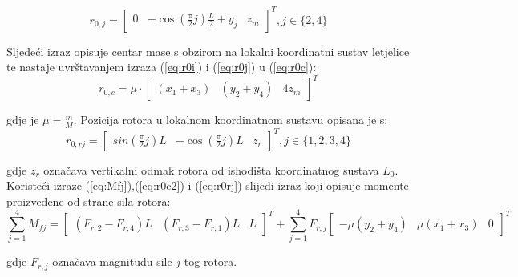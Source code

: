 \documentclass[11pt,a4paper]{article}
\begin{document}
\begin{equation}
r_{0,j} = \left[
\begin{matrix}
0 & -\cos\left(\frac{\pi}{2}j\right)\frac{L}{2} + y_{j} & z_{m}
\end{matrix} \right] ^{T}, j \in \{ 2, 4\}
\label{eq:r0j}
\end{equation}

 
Sljedeći izraz opisuje centar mase s obzirom na lokalni koordinatni sustav letjelice te nastaje uvrštavanjem izraza (\ref{eq:r0i}) i (\ref{eq:r0j}) u (\ref{eq:r0c}):
\begin{equation}
r_{0,c} = \mu \cdot \left[
\begin{matrix}
(x_{1} + x_{3}) & (y_{2} + y_{4}) & 4z_{m}
\end{matrix} \right]^{T}
\label{eq:r0c2}
\end{equation}

gdje je $\mu = \frac{m}{M}$. Pozicija rotora u lokalnom koordinatnom sustavu opisana je s:
\begin{equation}
r_{0,rj} = \left[
\begin{matrix}
sin\left(\frac{\pi}{2}j\right)L & -\cos\left(\frac{\pi}{2}j\right)L & z_{r}
\end{matrix} \right] ^{T}, j \in \{ 1, 2, 3, 4\}
\label{eq:r0rj}
\end{equation}

gdje $z_{r}$ označava vertikalni odmak rotora od ishodišta koordinatnog sustava $L_{0}$. Koristeći izraze (\ref{eq:Mfj}),(\ref{eq:r0c2}) i (\ref{eq:r0rj}) slijedi izraz koji opisuje momente proizvedene od strane sila rotora:
\begin{equation}
\sum_{j=1}^{4}M_{fj} = \left[
\begin{matrix}
(F_{r,2} - F_{r,4})L & (F_{r,3} - F_{r,1})L & L
\end{matrix}\right]^{T} + \sum_{j=1}^{4}F_{r,j} 
\left[\begin{matrix}
-\mu(y_{2} + y_{4}) & \mu(x_{1} + x_{3}) & 0
\end{matrix}\right]^{T}
\label{eq:sumaMfj}
\end{equation}

gdje $F_{r,j}$ označava magnitudu sile $j$-tog rotora. 

\medskip
\end{document}
